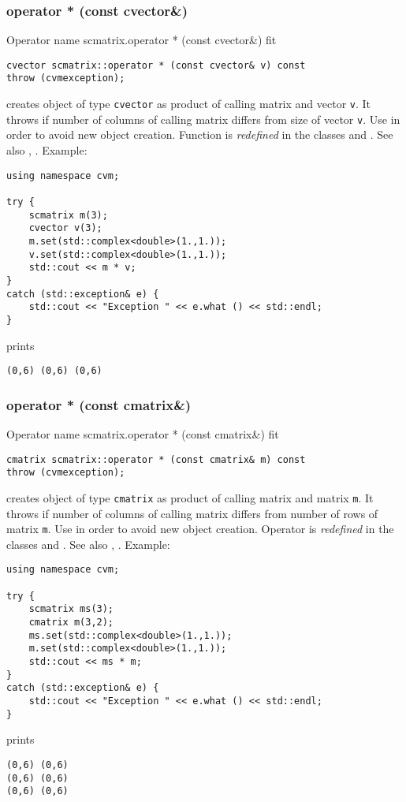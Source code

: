 \subsubsection{operator * (const cvector\&)}
Operator%
\pdfdest name {scmatrix.operator * (const cvector&)} fit
\begin{verbatim}
cvector scmatrix::operator * (const cvector& v) const
throw (cvmexception);
\end{verbatim}
creates  object of type \verb"cvector"
as  product of  calling matrix and  vector \verb"v".
It throws  
if  number of columns of  calling matrix
differs from  size of  vector \verb"v".
Use 
in order to avoid new object creation.
Function is \emph{redefined} in the classes
and .
See also
, .
Example:
\begin{Verbatim}
using namespace cvm;

try {
    scmatrix m(3);
    cvector v(3);
    m.set(std::complex<double>(1.,1.));
    v.set(std::complex<double>(1.,1.));
    std::cout << m * v;
}
catch (std::exception& e) {
    std::cout << "Exception " << e.what () << std::endl;
}
\end{Verbatim}
prints
\begin{Verbatim}
(0,6) (0,6) (0,6)
\end{Verbatim}
\newpage



\subsubsection{operator * (const cmatrix\&)}
Operator%
\pdfdest name {scmatrix.operator * (const cmatrix&)} fit
\begin{verbatim}
cmatrix scmatrix::operator * (const cmatrix& m) const
throw (cvmexception);
\end{verbatim}
creates  object of type \verb"cmatrix"
as  product of  calling matrix and  matrix \verb"m".
It throws  
if  number of columns of  calling matrix
differs from  number of rows of  matrix \verb"m".
Use  in order to avoid
 new object creation.
Operator is \emph{redefined} in the classes
and .
See also
, .
Example:
\begin{Verbatim}
using namespace cvm;

try {
    scmatrix ms(3);
    cmatrix m(3,2);
    ms.set(std::complex<double>(1.,1.));
    m.set(std::complex<double>(1.,1.));
    std::cout << ms * m;
}
catch (std::exception& e) {
    std::cout << "Exception " << e.what () << std::endl;
}
\end{Verbatim}
prints
\begin{Verbatim}
(0,6) (0,6)
(0,6) (0,6)
(0,6) (0,6)
\end{Verbatim}
\newpage



